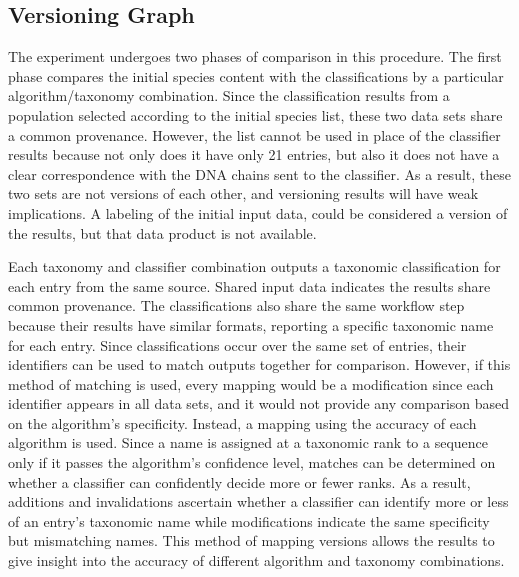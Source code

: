 \subsection{Versioning Graph}

The experiment undergoes two phases of comparison in this procedure.
The first phase compares the initial species content with the classifications by a particular algorithm/taxonomy combination.
Since the classification results from a population selected according to the initial species list, these two data sets share a common provenance.
However, the list cannot be used in place of the classifier results because not only does it have only 21 entries, but also it does not have a clear correspondence with the DNA chains sent to the classifier.
As a result, these two sets are not versions of each other, and versioning results will have weak implications.
A labeling of the initial input data, could be considered a version of the results, but that data product is not available.

Each taxonomy and classifier combination outputs a taxonomic classification for each entry from the same source.
Shared input data indicates the results share common provenance.
The classifications also share the same workflow step because their results have similar formats, reporting a specific taxonomic name for each entry.
Since classifications occur over the same set of entries, their identifiers can be used to match outputs together for comparison.
However, if this method of matching is used, every mapping would be a modification since each identifier appears in all data sets, and it would not provide any comparison based on the algorithm's specificity.
Instead, a mapping using the accuracy of each algorithm is used.
Since a name is assigned at a taxonomic rank to a sequence only if it passes the algorithm's confidence level, matches can be determined on whether a classifier can confidently decide more or fewer ranks.
As a result, additions and invalidations ascertain whether a classifier can identify more or less of an entry's taxonomic name while modifications indicate the same specificity but mismatching names.
This method of mapping versions allows the results to give insight into the accuracy of different algorithm and taxonomy combinations.